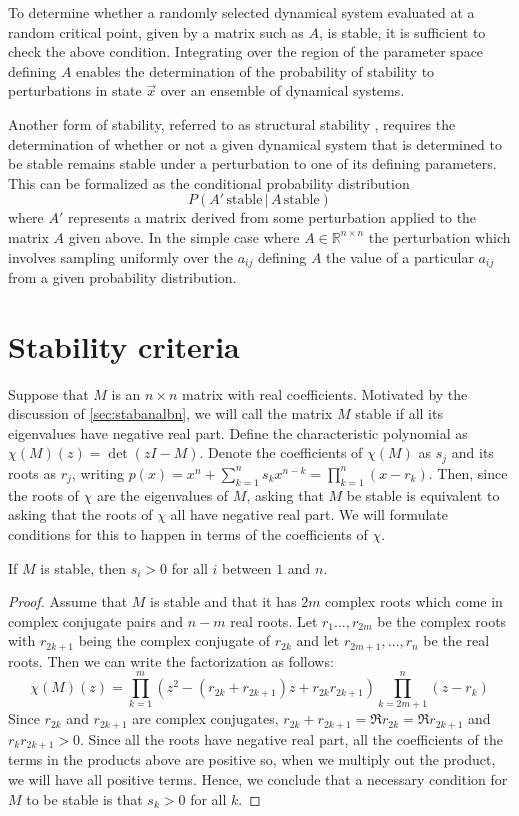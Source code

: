 To determine whether a randomly selected dynamical system evaluated at a random critical point, given by a matrix such as $A$, is stable, it is sufficient to check the above condition. Integrating over the region of the parameter space defining $A$ enables the determination of the probability of stability to perturbations in state $\vec{x}$ over an ensemble of dynamical systems.

Another form of stability, referred to as structural stability \cite{Smale1967}, requires the determination of whether or not a given dynamical system that is determined to be stable remains stable under a perturbation to one of its defining parameters. This can be formalized as the conditional probability distribution
$$
P(A' \, \textrm{stable}\, \big| \, A \, \textrm{stable})
$$
where $A'$ represents a matrix derived from some perturbation applied to the matrix $A$ given above. In the simple case where $A \in \mathbb{R}^{n \times n}$ the perturbation which involves sampling uniformly over the $a_{ij}$ defining $A$ the value of a particular $a_{ij}$ from a given probability distribution.

\section{Stability criteria}
Suppose that $M$ is an $n \times n$ matrix with real coefficients.
Motivated by the discussion of \ref{sec:stabanalbn}, we will call
the matrix $M$ stable if all its eigenvalues have negative real part.
Define the characteristic polynomial as $\chi(M)(z) = \det(zI - M)$.
Denote the coefficients of $\chi(M)$ as $s_j$ and its roots as $r_j$,
writing $p(x) = x^n + \sum_{k=1}^n s_k x^{n-k} = \prod_{k=1}^n (x-r_k)$.
Then, since the roots of $\chi$ are the eigenvalues of $M$, asking that
$M$ be stable is equivalent to asking that the roots of $\chi$ all have
negative real part.  We will formulate conditions for this to happen in
terms of the coefficients of $\chi$.

\begin{lemma}
If $M$ is stable, then $s_i > 0$ for all $i$ between $1$ and $n$.
\end{lemma}

\begin{proof}
Assume that $M$ is stable and that it has $2m$ complex roots which come in
complex conjugate pairs and $n-m$ real roots.  Let $r_1 \ldots, r_{2m}$ be
the complex roots with $r_{2k+1}$ being the complex conjugate of $r_{2k}$
and let $r_{2m+1}, \ldots,  r_{n}$ be the real roots. Then we can write the
factorization as follows:
\[
\chi(M)(z) = \prod_{k=1}^{m} (z^2 - (r_{2k} + r_{2k+1}) z + r_{2k} r_{2k+1})
             \prod_{k=2m+1}^{n} (z - r_k)
\]
Since $r_{2k}$ and $r_{2k+1}$ are complex conjugates, $r_{2k} + r_{2k+1} =
\Re r_{2k} = \Re r_{2k+1}$ and $r_{k} r_{2k+1} > 0$.   Since all the
roots have negative real part, all the coefficients of the terms in
the products above are positive so, when we multiply out the product,
we will have all positive terms.  Hence, we conclude that a necessary
condition for $M$ to be stable is that $s_k > 0$ for all $k$.
\end{proof}

